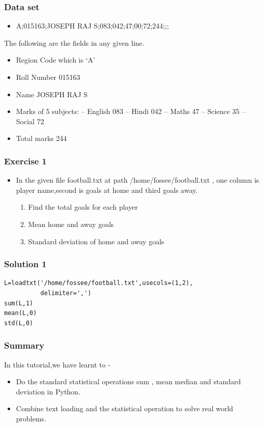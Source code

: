 \documentclass[presentation]{beamer}
\begin{document}
\begin{frame}
\frametitle{Data set}
\label{sec-4}


\begin{itemize}
\item A;015163;JOSEPH RAJ S;083;042;47;00;72;244;;;
\end{itemize}

  The following are the fields in any given line.

\begin{itemize}
\item Region Code which is `A'
\item Roll Number 015163
\item Name JOSEPH RAJ S
\item Marks of 5 subjects: -- English 083 -- 
     Hindi 042 -- Maths 47 --
     Science 35 -- Social 72
\item Total marks 244
\end{itemize}
\end{frame}
\begin{frame}
\frametitle{Exercise 1}
\label{sec-5}


\begin{itemize}
\item In the given file football.txt at path /home/fossee/football.txt , 
    one column is player name,second is goals at home 
    and third goals away.
\vspace{8pt}
\begin{enumerate}
\item Find the total goals for each player
\item Mean home and away goals
\item Standard deviation of home and away goals
\end{enumerate}
\end{itemize}
\end{frame}
\begin{frame}[fragile]
\frametitle{Solution 1}
\label{sec-6}

\lstset{language=Python}
\begin{lstlisting}
L=loadtxt('/home/fossee/football.txt',usecols=(1,2),
          delimiter=',')
sum(L,1)
mean(L,0)
std(L,0)
\end{lstlisting}
\end{frame}
\begin{frame}
\frametitle{Summary}
\label{sec-7}

  In this tutorial,we have learnt to -


\begin{itemize}
\item Do the standard statistical operations sum , mean
    median and standard deviation in Python.
\item Combine text loading and the statistical operation to solve
    real world problems.
\end{itemize}
\end{frame}
\end{document}

